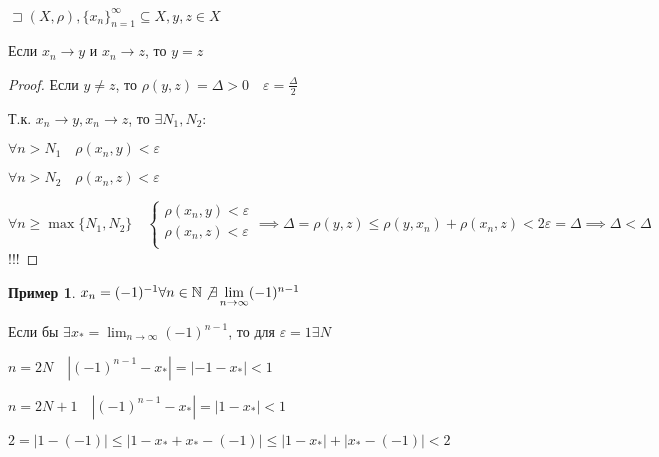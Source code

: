 \documentclass{book}
\newcommand\N{\ensuremath{\mathbb{N}}}
\theoremstyle{definition}
\newtheorem*{example}{Пример}
\begin{document}
    \begin{statement}

        $\sqsupset (X, \rho), \{x_n\}_{n=1}^{\infty }\subseteq X, y, z\in X $

        Если $x_n\to y$ и $x_n\to z$, то $y=z$
    \end{statement}
    \begin{proof}
        Если $y\neq z$, то $\rho(y,z) = \Delta>0\quad \varepsilon = \frac{\Delta}{2}$

        Т.к. $x_n \to y, x_{n} \to z$, то $\exists N_1, N_2:$

        $\forall n>N_1\quad \rho(x_n,y)<\varepsilon$

        $\forall n>N_2\quad \rho(x_n,z)<\varepsilon$

        $\forall n\geqslant \max\{N_1, N_2\}\quad \begin{cases}
            \rho(x_{n} , y)<\varepsilon \\
            \rho(x_{n} , z)<\varepsilon\\
        \end{cases} \implies  \Delta = \rho(y,z) \leqslant  \rho(y, x_{n}) + \rho(x_{n} , z)<2\varepsilon = \Delta \implies \Delta<\Delta $ !!!
    \end{proof}
    \begin{example}
        $x_n = (-1)^{-1} \forall n\in \N  \not\exists \lim_{n \to \infty} (-1)^{n-1}$

        Если бы $\exists x_* = \lim_{n \to \infty} (-1)^{n-1}$, то для $\varepsilon = 1 \exists N$

        $n=2N\quad \left| (-1)^{n-1} - x_* \right| = |-1-x_*|<1 $

        $n=2N+1\quad \left| (-1)^{n-1} - x_* \right| = |1-x_*|<1 $

    $2 = |1 - (-1)|\leqslant |1-x_* + x_*-(-1)| \leqslant |1-x_*| + |x_* - (-1)| <2$
    \end{example}
\end{document}
